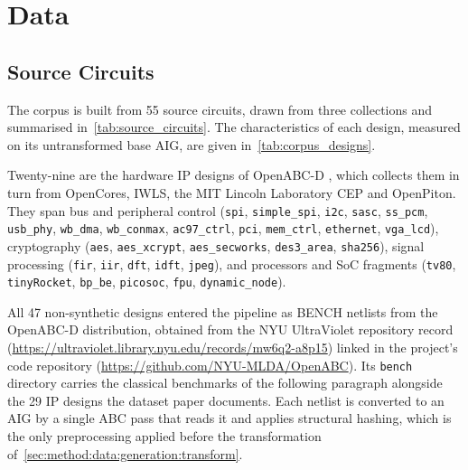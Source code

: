 \section{Data}
\label{sec:method:data}


\subsection{Source Circuits}
\label{sec:method:data:sources}
The corpus is built from 55 source circuits, drawn from three collections and summarised
in~\ref{tab:source_circuits}. The characteristics of each design, measured on its
untransformed base AIG, are given in~\ref{tab:corpus_designs}.

Twenty-nine are the hardware IP designs of OpenABC-D \citep{chowdhury2021openabc}, which
collects them in turn from OpenCores, IWLS, the MIT Lincoln Laboratory CEP and OpenPiton.
They span bus and peripheral control (\texttt{spi}, \texttt{simple\_spi}, \texttt{i2c},
\texttt{sasc}, \texttt{ss\_pcm}, \texttt{usb\_phy}, \texttt{wb\_dma}, \texttt{wb\_conmax},
\texttt{ac97\_ctrl}, \texttt{pci}, \texttt{mem\_ctrl}, \texttt{ethernet},
\texttt{vga\_lcd}), cryptography (\texttt{aes}, \texttt{aes\_xcrypt},
\texttt{aes\_secworks}, \texttt{des3\_area}, \texttt{sha256}), signal processing
(\texttt{fir}, \texttt{iir}, \texttt{dft}, \texttt{idft}, \texttt{jpeg}), and processors and
SoC fragments (\texttt{tv80}, \texttt{tinyRocket}, \texttt{bp\_be}, \texttt{picosoc},
\texttt{fpu}, \texttt{dynamic\_node}).

All 47 non-synthetic designs entered the pipeline as BENCH netlists from the OpenABC-D
distribution, obtained from the NYU UltraViolet repository record
(\url{https://ultraviolet.library.nyu.edu/records/mw6q2-a8p15}) linked in the project's code
repository (\url{https://github.com/NYU-MLDA/OpenABC}). Its \texttt{bench} directory carries
the classical benchmarks of the following paragraph alongside the 29 IP designs the dataset
paper documents. Each netlist is converted to an AIG by a single ABC pass that reads it and
applies structural hashing, which is the only preprocessing applied before the
transformation of~\ref{sec:method:data:generation:transform}.

